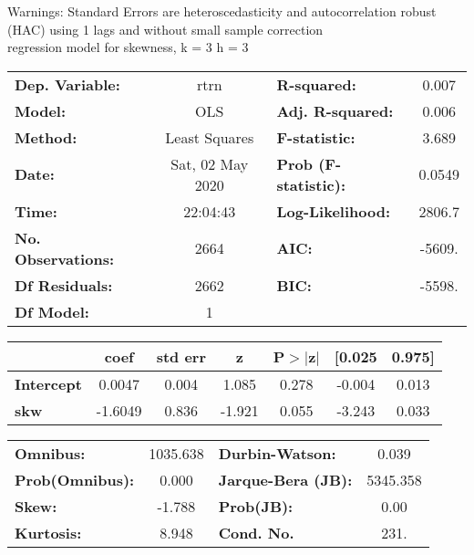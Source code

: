 Warnings: \newline
 [1] Standard Errors are heteroscedasticity and autocorrelation robust (HAC) using 1 lags and without small sample correction\\ 

regression model for skewness, k = 3 h = 3\begin{center}
\begin{tabular}{lclc}
\toprule
\textbf{Dep. Variable:}    &       rtrn       & \textbf{  R-squared:         } &     0.007   \\
\textbf{Model:}            &       OLS        & \textbf{  Adj. R-squared:    } &     0.006   \\
\textbf{Method:}           &  Least Squares   & \textbf{  F-statistic:       } &     3.689   \\
\textbf{Date:}             & Sat, 02 May 2020 & \textbf{  Prob (F-statistic):} &   0.0549    \\
\textbf{Time:}             &     22:04:43     & \textbf{  Log-Likelihood:    } &    2806.7   \\
\textbf{No. Observations:} &        2664      & \textbf{  AIC:               } &    -5609.   \\
\textbf{Df Residuals:}     &        2662      & \textbf{  BIC:               } &    -5598.   \\
\textbf{Df Model:}         &           1      & \textbf{                     } &             \\
\bottomrule
\end{tabular}
\begin{tabular}{lcccccc}
                   & \textbf{coef} & \textbf{std err} & \textbf{z} & \textbf{P$> |$z$|$} & \textbf{[0.025} & \textbf{0.975]}  \\
\midrule
\textbf{Intercept} &       0.0047  &        0.004     &     1.085  &         0.278        &       -0.004    &        0.013     \\
\textbf{skw}       &      -1.6049  &        0.836     &    -1.921  &         0.055        &       -3.243    &        0.033     \\
\bottomrule
\end{tabular}
\begin{tabular}{lclc}
\textbf{Omnibus:}       & 1035.638 & \textbf{  Durbin-Watson:     } &    0.039  \\
\textbf{Prob(Omnibus):} &   0.000  & \textbf{  Jarque-Bera (JB):  } & 5345.358  \\
\textbf{Skew:}          &  -1.788  & \textbf{  Prob(JB):          } &     0.00  \\
\textbf{Kurtosis:}      &   8.948  & \textbf{  Cond. No.          } &     231.  \\
\bottomrule
\end{tabular}
\end{center}

